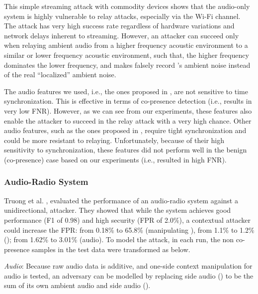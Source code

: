 This simple streaming attack with commodity devices shows that the
audio-only system is highly vulnerable to relay attacks, especially via the
Wi-Fi channel. The attack has very high success rate regardless of hardware
variations and network delays inherent to streaming. However, an attacker can
succeed only when relaying ambient audio from a higher frequency acoustic
environment to a similar or lower frequency acoustic environment, such that,
the higher frequency dominates the lower frequency, and makes \verifier falsely
record \prover's ambient noise instead of the real ``localized'' ambient noise. 


The audio features we used, i.e., the ones proposed in
\cite{DBLP:conf/esorics/HaleviMSX12}, are not sensitive to time
synchronization. This is effective in terms of co-presence detection (i.e.,
results in very low FNR). However, as we can see from our experiments, these
features also enable the attacker to succeed in the relay attack with a very
high chance. Other audio features, such as the ones proposed in
\cite{schurmann2013audio}, require tight synchronization and could be more
resistant to relaying. Unfortunately, because of their high sensitivity to
synchronization, these features did not perform well in the benign
(co-presence) case based on our experiments (i.e., resulted in high FNR).










\subsubsection{Audio-Radio System}
Truong et al. \cite{TruongPerCom14}, evaluated the performance of an
audio-radio system against a unidirectional, \singlemodal attacker. They showed
that while the system achieves good performance (F1 of 0.98) and high security
(FPR of 2.0\%), a contextual attacker could increase the FPR: from 0.18\% to 65.8\%
(manipulating \wifi), from 1.1\% to 1.2\% (\bluetooth); from 1.62\% to 3.01\%
(audio). 
 To model the attack, in each run, the non
co-presence samples in the test data were transformed as below.






\noindent\textit{Audio}: Because raw audio data is additive, and one-side
context manipulation for audio is tested, an adversary can be modelled by
replacing \verifier side audio () to be the sum of its own ambient
audio and \prover side audio ().
    
